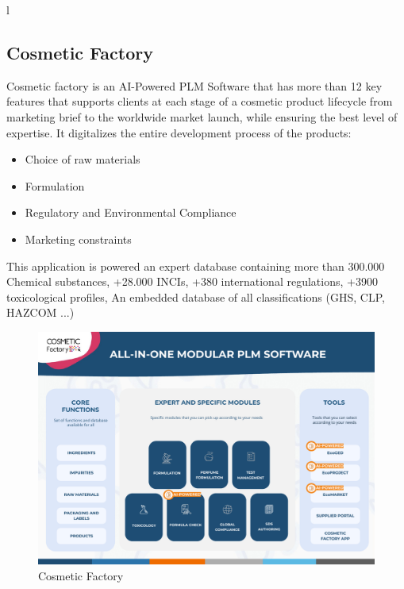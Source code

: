 l\documentclass[a4paper,12pt,twoside]{report}
\begin{document}
\subsection{Cosmetic Factory}
Cosmetic factory is an AI-Powered PLM Software that has more than 12 key features that supports clients at each stage of a cosmetic product lifecycle from marketing brief to the worldwide market launch, while ensuring the best level of expertise. It digitalizes the entire development process of the products: 
\begin{itemize}
\item Choice of raw materials
\item Formulation
\item Regulatory and Environmental Compliance
\item Marketing constraints
\end{itemize}
This application is powered an expert database containing more than 300.000 Chemical substances, +28.000 INCIs, +380 international regulations, +3900 toxicological profiles, An embedded database of all classifications (GHS, CLP, HAZCOM ...)
\begin{figure}[H]
		\includegraphics[width=\textwidth]{images/cf_ALLinONE}
	\caption[CF All in One]{Cosmetic Factory}
	\label{cfAiO}
\end{figure}
\end{document}
